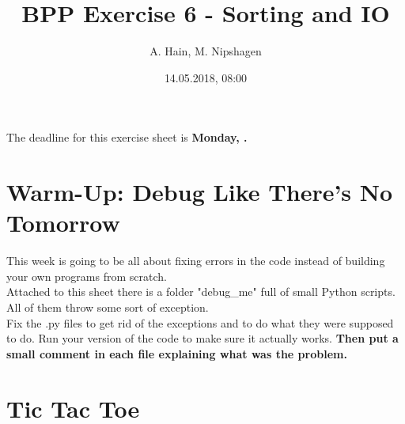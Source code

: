 
\usepackage{tikz}
\usetikzlibrary{arrows,automata}

\title{BPP Exercise 6 - Sorting and IO}
\author{A. Hain, M. Nipshagen}
\date{14.05.2018, 08:00}

\makeatletter
\let\thetitle\@title
\let\theauthor\@author
\let\thedate\@date
\makeatother





The deadline for this exercise sheet is \textbf{Monday, \thedate.}
%
%

\section{Warm-Up: Debug Like There's No Tomorrow}

This week is going to be all about fixing errors in the code instead of building
your own programs from scratch.\\
Attached to this sheet there is a folder "debug\_me" full of small Python scripts. All of them throw
some sort of exception.\\
Fix the .py files to get rid of the exceptions and to do what they were supposed
to do. Run your version of the code to make sure it actually works.
\textbf{Then put a small comment in each file explaining what was the problem.}\\

\section{Tic Tac Toe}




